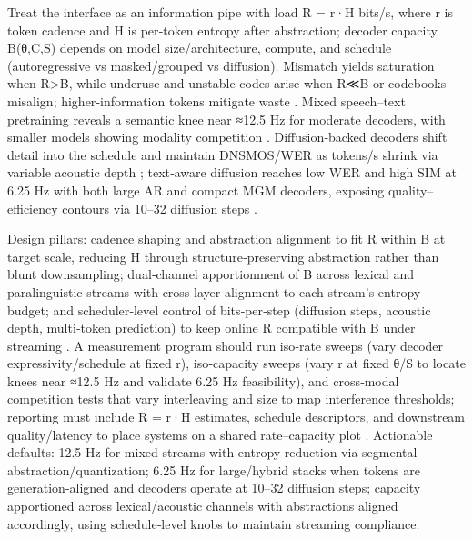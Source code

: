 \documentclass{article}
\begin{document}
Treat the interface as an information pipe with load R = r·H bits/s, where r is token cadence and H is per‑token entropy after abstraction; decoder capacity B(θ,C,S) depends on model size/architecture, compute, and schedule (autoregressive vs masked/grouped vs diffusion). Mismatch yields saturation when R>B, while underuse and unstable codes arise when R≪B or codebooks misalign; higher‑information tokens mitigate waste \cite{huang2024repcodecspeechrepresentationcodectokeniz,chen2023reducingbarriersselfsupervisedlearninghu}. Mixed speech–text pretraining reveals a semantic knee near ≈12.5 Hz for moderate decoders, with smaller models showing modality competition \cite{zeng2024scalingspeechtextpretrainingsyntheticint}. Diffusion‑backed decoders shift detail into the schedule and maintain DNSMOS/WER as tokens/s shrink via variable acoustic depth \cite{yang2025diffsoundstreamefficientspeechtokenizati}; text‑aware diffusion reaches low WER and high SIM at 6.25 Hz with both large AR and compact MGM decoders, exposing quality–efficiency contours via 10–32 diffusion steps \cite{wang2025tadicodectextawarediffusionspeechtokeniz}.

Design pillars: cadence shaping and abstraction alignment to fit R within B at target scale, reducing H through structure‑preserving abstraction rather than blunt downsampling; dual‑channel apportionment of B across lexical and paralinguistic streams with cross‑layer alignment to each stream’s entropy budget; and scheduler‑level control of bits‑per‑step (diffusion steps, acoustic depth, multi‑token prediction) to keep online R compatible with B under streaming \cite{zeng2024scalingspeechtextpretrainingsyntheticint,yang2025diffsoundstreamefficientspeechtokenizati,wang2025tadicodectextawarediffusionspeechtokeniz}. A measurement program should run iso‑rate sweeps (vary decoder expressivity/schedule at fixed r), iso‑capacity sweeps (vary r at fixed θ/S to locate knees near ≈12.5 Hz and validate 6.25 Hz feasibility), and cross‑modal competition tests that vary interleaving and size to map interference thresholds; reporting must include R = r·H estimates, schedule descriptors, and downstream quality/latency to place systems on a shared rate–capacity plot \cite{zeng2024scalingspeechtextpretrainingsyntheticint,yang2025diffsoundstreamefficientspeechtokenizati,wang2025tadicodectextawarediffusionspeechtokeniz}. Actionable defaults: 12.5 Hz for mixed streams with entropy reduction via segmental abstraction/quantization; 6.25 Hz for large/hybrid stacks when tokens are generation‑aligned and decoders operate at 10–32 diffusion steps; capacity apportioned across lexical/acoustic channels with abstractions aligned accordingly, using schedule‑level knobs to maintain streaming compliance.
\end{document}
